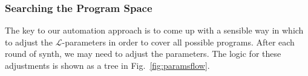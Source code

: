 \begin{itemize}




\end{itemize}
\subsubsection{Searching the Program Space}

The key to our automation approach is to come up with a sensible way in which to
adjust the $\mathcal{L}$-parameters in order to cover all possible programs.
After each round of {\sc synth}, we may need to adjust the parameters.  The
logic for these adjustments is shown as a tree in Fig.~\ref{fig:paramsflow}.

